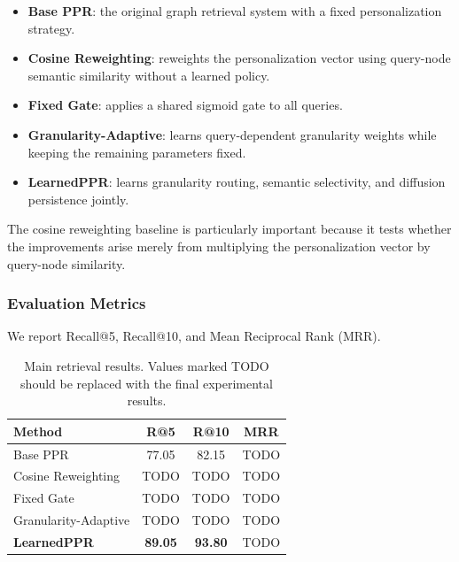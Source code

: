 \documentclass[conference]{IEEEtran}
\newcommand{\method}{LearnedPPR}
\begin{document}
\begin{itemize}
    \item \textbf{Base PPR}: the original graph retrieval system with
    a fixed personalization strategy.
    \item \textbf{Cosine Reweighting}: reweights the personalization
    vector using query-node semantic similarity without a learned
    policy.
    \item \textbf{Fixed Gate}: applies a shared sigmoid gate to all
    queries.
    \item \textbf{Granularity-Adaptive}: learns query-dependent
    granularity weights while keeping the remaining parameters fixed.
    \item \textbf{\method}: learns granularity routing, semantic
    selectivity, and diffusion persistence jointly.
\end{itemize}

The cosine reweighting baseline is particularly important because it
tests whether the improvements arise merely from multiplying the
personalization vector by query-node similarity.

\subsubsection{Evaluation Metrics}

We report Recall@5, Recall@10, and Mean Reciprocal Rank (MRR).


\begin{table}[t]
\centering
\caption{Main retrieval results. Values marked TODO should be replaced
with the final experimental results.}
\label{tab:main}
\begin{tabular}{lccc}
\toprule
Method & R@5 & R@10 & MRR \\
\midrule
Base PPR & 77.05 & 82.15 & TODO \\
Cosine Reweighting & TODO & TODO & TODO \\
Fixed Gate & TODO & TODO & TODO \\
Granularity-Adaptive & TODO & TODO & TODO \\
\textbf{\method} & \textbf{89.05} & \textbf{93.80} & TODO \\
\bottomrule
\end{tabular}
\end{table}
\end{document}
